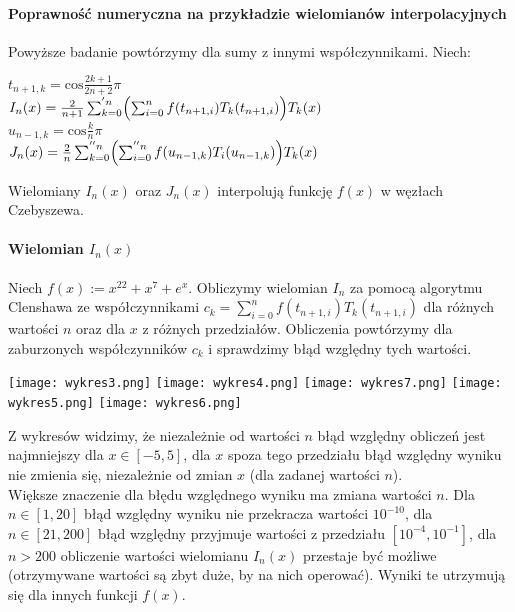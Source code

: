 \documentclass[10pt]{article}
\begin{document}
\paragraph{Poprawność numeryczna na przykładzie wielomianów interpolacyjnych}
Powyższe badanie powtórzymy dla sumy z innymi współczynnikami. Niech:
\begin{center}
$t_{n+1,k} = \textrm{cos} \frac{2k+1}{2n+2} \pi$\\
\vspace{0.3em} $I_{n} (x) = \frac{2}{n+1} \sum_{k=0}^{'n} \Bigl( \sum_{i=0}^{n} f(t_{n+1,i}) T_{k}(t_{n+1,i}) \Bigr) T_{k}(x)$\\
\vspace{0.2em} $u_{n-1,k} = \textrm{cos} \frac{k}{n} \pi$ \\
\vspace{0.3em} $J_{n} (x) = \frac{2}{n} \sum_{k=0}^{''n} \Bigl( \sum_{i=0}^{''n} f(u_{n-1,k}) T_{i}(u_{n-1,k}) \Bigr) T_{k}(x)$
\end{center}
Wielomiany $I_{n}(x)$ oraz $J_{n}(x)$ interpolują funkcję $f(x)$ w węzłach Czebyszewa. 
\paragraph{Wielomian $I_{n}(x)$}
Niech $f(x) := x^{22} + x^{7} + e^{x}$. Obliczymy wielomian $I_{n}$ za pomocą algorytmu Clenshawa ze współczynnikami $c_{k} = \sum_{i=0}^{n} f(t_{n+1,i}) T_{k}(t_{n+1,i})$ dla różnych wartości $n$ oraz dla $x$ z różnych przedziałów. Obliczenia powtórzymy dla zaburzonych współczynników $c_{k}$ i sprawdzimy błąd względny tych wartości.
\begin{center}
\texttt{[image: wykres3.png]}
\texttt{[image: wykres4.png]}
\texttt{[image: wykres7.png]}
\texttt{[image: wykres5.png]}
\texttt{[image: wykres6.png]}
\end{center}
Z wykresów widzimy, że niezależnie od wartości $n$ błąd względny obliczeń jest najmniejszy dla $x \in [-5,5]$, dla $x$ spoza tego przedziału błąd względny wyniku nie zmienia się, niezależnie od zmian $x$ (dla zadanej wartości $n$). \\
Większe znaczenie dla błędu względnego wyniku ma zmiana wartości $n$. Dla $n \in [1,20]$ błąd względny wyniku nie przekracza wartości $10^{-10}$, dla $n \in [21,200]$ błąd względny przyjmuje wartości z przedziału $[10^{-4},10^{-1}]$, dla $n > 200$ obliczenie wartości wielomianu $I_{n}(x)$ przestaje być możliwe (otrzymywane wartości są zbyt duże, by na nich operować). Wyniki te utrzymują się dla innych funkcji $f(x)$.
\end{document}
